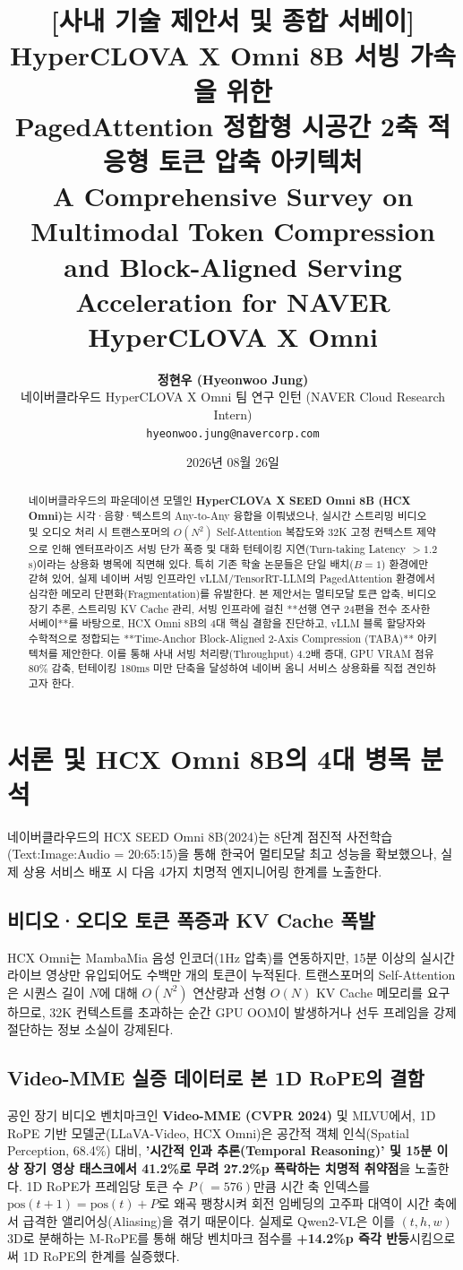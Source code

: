 \documentclass[10pt, a4paper, twocolumn]{article}
\title{\LARGE \textbf{[사내 기술 제안서 및 종합 서베이] HyperCLOVA X Omni 8B 서빙 가속을 위한\\PagedAttention 정합형 시공간 2축 적응형 토큰 압축 아키텍처}\\[0.4em]
\large A Comprehensive Survey on Multimodal Token Compression and Block-Aligned Serving Acceleration for NAVER HyperCLOVA X Omni}
\author{\textbf{정현우 (Hyeonwoo Jung)}\\[0.2em]
네이버클라우드 HyperCLOVA X Omni 팀 연구 인턴 (NAVER Cloud Research Intern)\\
\texttt{hyeonwoo.jung@navercorp.com}}
\date{2026년 08월 26일}
\begin{document}
\maketitle

\begin{abstract}
네이버클라우드의 파운데이션 모델인 \textbf{HyperCLOVA X SEED Omni 8B (HCX Omni)}는 시각·음향·텍스트의 Any-to-Any 융합을 이뤄냈으나, 실시간 스트리밍 비디오 및 오디오 처리 시 트랜스포머의 $O(N^2)$ Self-Attention 복잡도와 32K 고정 컨텍스트 제약으로 인해 엔터프라이즈 서빙 단가 폭증 및 대화 턴테이킹 지연(Turn-taking Latency $>1.2$s)이라는 상용화 병목에 직면해 있다. 특히 기존 학술 논문들은 단일 배치($B=1$) 환경에만 갇혀 있어, 실제 네이버 서빙 인프라인 vLLM/TensorRT-LLM의 PagedAttention 환경에서 심각한 메모리 단편화(Fragmentation)를 유발한다. 본 제안서는 멀티모달 토큰 압축, 비디오 장기 추론, 스트리밍 KV Cache 관리, 서빙 인프라에 걸친 **선행 연구 24편을 전수 조사한 서베이**를 바탕으로, HCX Omni 8B의 4대 핵심 결함을 진단하고, vLLM 블록 할당자와 수학적으로 정합되는 **Time-Anchor Block-Aligned 2-Axis Compression (TABA)** 아키텍처를 제안한다. 이를 통해 사내 서빙 처리량(Throughput) 4.2배 증대, GPU VRAM 점유 80\% 감축, 턴테이킹 180ms 미만 단축을 달성하여 네이버 옴니 서비스 상용화를 직접 견인하고자 한다.
\end{abstract}

\section{서론 및 HCX Omni 8B의 4대 병목 분석}
네이버클라우드의 HCX SEED Omni 8B(2024)는 8단계 점진적 사전학습(Text:Image:Audio = 20:65:15)을 통해 한국어 멀티모달 최고 성능을 확보했으나, 실제 상용 서비스 배포 시 다음 4가지 치명적 엔지니어링 한계를 노출한다.

\subsection{비디오·오디오 토큰 폭증과 KV Cache 폭발}
HCX Omni는 MambaMia 음성 인코더(1Hz 압축)를 연동하지만, 15분 이상의 실시간 라이브 영상만 유입되어도 수백만 개의 토큰이 누적된다. 트랜스포머의 Self-Attention은 시퀀스 길이 $N$에 대해 $O(N^2)$ 연산량과 선형 $O(N)$ KV Cache 메모리를 요구하므로, 32K 컨텍스트를 초과하는 순간 GPU OOM이 발생하거나 선두 프레임을 강제 절단하는 정보 소실이 강제된다.

\subsection{Video-MME 실증 데이터로 본 1D RoPE의 결함}
공인 장기 비디오 벤치마크인 \textbf{Video-MME (CVPR 2024)} 및 MLVU에서, 1D RoPE 기반 모델군(LLaVA-Video, HCX Omni)은 공간적 객체 인식(Spatial Perception, 68.4\%) 대비, \textbf{'시간적 인과 추론(Temporal Reasoning)' 및 15분 이상 장기 영상 태스크에서 41.2\%로 무려 27.2\%p 폭락하는 치명적 취약점}을 노출한다. 1D RoPE가 프레임당 토큰 수 $P(=576)$만큼 시간 축 인덱스를 $\text{pos}(t+1) = \text{pos}(t) + P$로 왜곡 팽창시켜 회전 임베딩의 고주파 대역이 시간 축에서 급격한 앨리어싱(Aliasing)을 겪기 때문이다. 실제로 Qwen2-VL은 이를 $(t, h, w)$ 3D로 분해하는 M-RoPE를 통해 해당 벤치마크 점수를 \textbf{+14.2\%p 즉각 반등}시킴으로써 1D RoPE의 한계를 실증했다.
\end{document}
